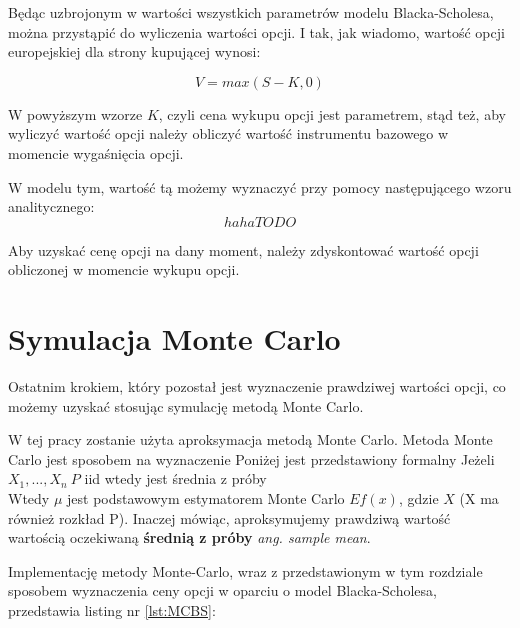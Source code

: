 \documentclass{pracamgr}
\begin{document}
Będąc uzbrojonym w wartości wszystkich parametrów modelu Blacka-Scholesa, można przystąpić
do wyliczenia wartości opcji. I tak, jak wiadomo, wartość opcji europejskiej dla strony kupującej 
wynosi:

\begin{equation}
  V = max(S-K, 0)
\end{equation}

W powyższym wzorze $K$, czyli cena wykupu opcji jest parametrem, stąd też,  aby wyliczyć wartość opcji należy obliczyć wartość instrumentu bazowego w momencie wygaśnięcia opcji.

W modelu tym, wartość tą możemy wyznaczyć przy pomocy następującego wzoru analitycznego:
\begin{equation}
  haha TODO
\end{equation}

Aby uzyskać cenę opcji na dany moment, należy zdyskontować wartość opcji obliczonej w momencie wykupu opcji.

\section{Symulacja Monte Carlo}

Ostatnim krokiem, który pozostał jest wyznaczenie prawdziwej wartości opcji, co możemy uzyskać 
stosując symulację metodą Monte Carlo.

W tej pracy zostanie użyta aproksymacja metodą Monte Carlo. Metoda Monte Carlo jest sposobem na wyznaczenie 
Poniżej jest przedstawiony formalny 
Jeżeli $X_1, ..., X_n ~P$ iid  wtedy
jest średnia z próby 
\begin{equation}
  
\end{equation}
Wtedy $\mu$ jest podstawowym estymatorem Monte Carlo $Ef(x)$, gdzie $X$ (X ma również rozkład P). Inaczej mówiąc, aproksymujemy prawdziwą wartość wartością oczekiwaną \textbf{średnią z próby} \textit{ang. sample mean}.

Implementację metody Monte-Carlo, wraz z przedstawionym w tym rozdziale sposobem wyznaczenia 
ceny opcji w oparciu o model Blacka-Scholesa, przedstawia listing nr \ref{lst:MCBS}:




\end{document}
